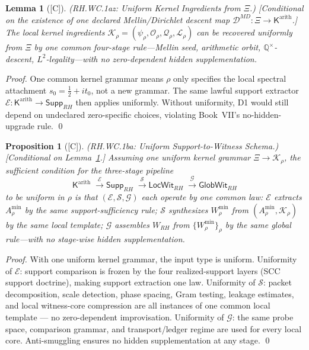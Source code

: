 \documentclass[12pt,oneside]{amsbook}
\theoremstyle{plain}
\newtheorem{lemma}[theorem]{Lemma}
\newtheorem{proposition}[theorem]{Proposition}
\theoremstyle{definition}
\theoremstyle{remark}
\newcommand{\status}[1]{\textup{[#1]}}
\begin{document}
\begin{lemma}[\status{C}]\label{lem:rh-wc1az}
\textup{(RH.WC.1az: Uniform Kernel Ingredients from $\Xi$.)}
\textup{[Conditional on the existence of one declared Mellin/Dirichlet
descent map $\mathcal{D}^{MD}:\Xi \to \mathsf{K}^{\mathrm{arith}}$.]}
The local kernel ingredients
$\mathcal{K}_\rho = (\psi_\rho, \mathcal{O}_\rho, \mathcal{Q}_\rho,
\mathcal{L}_\rho)$ can be recovered uniformly from $\Xi$ by one
common four-stage rule---Mellin seed, arithmetic orbit, $\mathbb{Q}^\times$-descent,
$L^2$-legality---with no zero-dependent hidden supplementation.
\end{lemma}

\begin{proof}
One common kernel grammar means $\rho$ only specifies the local
spectral attachment $s_0 = \tfrac{1}{2}+it_0$, not a new grammar.
The same lawful support extractor $\mathcal{E}:\mathsf{K}^{\mathrm{arith}}
\to \mathsf{Supp}_{RH}$ then applies uniformly. Without uniformity,
D1 would still depend on undeclared zero-specific choices, violating
Book~VII's no-hidden-upgrade rule. \qed
\end{proof}

\begin{proposition}[\status{C}]\label{prop:rh-wc1ba}
\textup{(RH.WC.1ba: Uniform Support-to-Witness Schema.)}
\textup{[Conditional on Lemma~\ref{lem:rh-wc1az}.]}
Assuming one uniform kernel grammar $\Xi \to \mathcal{K}_\rho$,
the sufficient condition for the three-stage pipeline
\[
 \mathsf{K}^{\mathrm{arith}}
 \;\xrightarrow{\;\mathcal{E}\;}
 \mathsf{Supp}_{RH}
 \;\xrightarrow{\;\mathcal{S}\;}
 \mathsf{LocWit}_{RH}
 \;\xrightarrow{\;\mathcal{G}\;}
 \mathsf{GlobWit}_{RH}
\]
to be uniform in $\rho$ is that $(\mathcal{E}, \mathcal{S},
\mathcal{G})$ each operate by one common law: $\mathcal{E}$ extracts
$A_\rho^{\min}$ by the same support-sufficiency rule; $\mathcal{S}$
synthesizes $W_\rho^{\min}$ from $(A_\rho^{\min}, \mathcal{K}_\rho)$
by the same local template; $\mathcal{G}$ assembles $W_{RH}$ from
$\{W_\rho^{\min}\}_\rho$ by the same global rule---with no
stage-wise hidden supplementation.
\end{proposition}

\begin{proof}
With one uniform kernel grammar, the input type is uniform.
Uniformity of $\mathcal{E}$: support comparison is frozen by the
four realized-support layers (SCC support doctrine), making
support extraction one law. Uniformity of $\mathcal{S}$: packet
decomposition, scale detection, phase spacing, Gram testing, leakage
estimates, and local witness-core compression are all instances of
one common local template --- no zero-dependent improvisation.
Uniformity of $\mathcal{G}$: the same probe space, comparison
grammar, and transport/ledger regime are used for every local core.
Anti-smuggling ensures no hidden supplementation at any stage. \qed
\end{proof}
\end{document}
